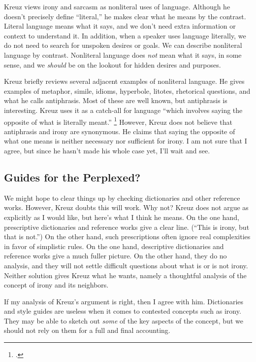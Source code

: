 \documentclass[12pt,letterpaper]{article}
\begin{document}
Kreuz views irony and sarcasm as nonliteral uses of language.
Although he doesn't precisely define ``literal,'' he makes clear what he means by the contrast.
Literal language means what it says, and we don't need extra information or context to understand it.
In addition, when a speaker uses language literally, we do not need to search for unspoken desires or goals.
We can describe nonliteral language by contrast.
Nonliteral language does \textit{not} mean what it says, in some sense, and we \textit{should} be on the lookout for hidden desires and purposes.

Kreuz briefly reviews several adjacent examples of nonliteral language.
He gives examples of metaphor, simile, idioms, hyperbole, litotes, rhetorical questions, and what he calls antiphrasis.
Most of these are well known, but antiphrasis is interesting.
Kreuz uses it as a catch-all for language ``which involves saying the opposite of what is literally meant.''%
\footcite[][5]{kreuz-irony-and-sarcasm-2020}
However, Kreuz does not believe that antiphrasis and irony are synonymous.
He claims that saying the opposite of what one means is neither necessary nor sufficient for irony.
I am not sure that I agree, but since he hasn't made his whole case yet, I'll wait and see.

\subsection*{Guides for the Perplexed?}

We might hope to clear things up by checking dictionaries and other reference works.
However, Kreuz doubts this will work.
Why not?
Kreuz does not argue as explicitly as I would like, but here's what I think he means.
On the one hand, prescriptive dictionaries and reference works give a clear line.
(``This is irony, but that is not.'')
On the other hand, such prescriptions often ignore real complexities in favor of simplistic rules.
On the one hand, descriptive dictionaries and reference works give a much fuller picture.
On the other hand, they do no analysis, and they will not settle difficult questions about what is or is not irony.
Neither solution gives Kreuz what he wants, namely a thoughtful analysis of the concept of irony and its neighbors.

If my analysis of Kreuz's argument is right, then I agree with him.
Dictionaries and style guides are useless when it comes to contested concepts such as irony.
They may be able to sketch out \textit{some} of the key aspects of the concept, but we should not rely on them for a full and final accounting.
\end{document}
